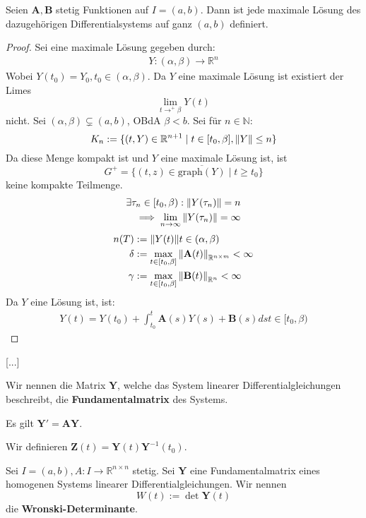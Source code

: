 \documentclass{report}
\newcommand{\tbf}[1]{\textbf{#1}}
\newcommand{\bN}{\mathbb{N}}
\newcommand{\bR}{\mathbb{R}}
\newcommand{\tbA}{\mathbf{A}}
\newcommand{\tbB}{\mathbf{B}}
\newcommand{\tbY}{\mathbf{Y}}
\newcommand{\tbZ}{\mathbf{Z}}
\begin{document}
\begin{theorem}
	Seien $\tbA, \tbB$ stetig Funktionen auf $I = (a,b)$. Dann ist jede maximale Lösung des dazugehörigen Differentialsystems auf ganz $(a,b)$ definiert.
\end{theorem}
\begin{proof}
	Sei eine maximale Lösung gegeben durch:
	\begin{align*}
		Y : (\alpha, \beta) \to \bR^n
	\end{align*}
	Wobei $Y(t_0) = Y_0, t_0 \in (\alpha, \beta)$. Da $Y$ eine maximale Lösung ist existiert der Limes
	\[\lim_{t \to^+ \beta} Y(t)\] 
	nicht. Sei $(\alpha, \beta) \subsetneq (a,b)$, OBdA $\beta < b$. Sei für $n \in \bN$:
	\[K_n := \{(t,Y) \in \bR^{n+1} \mid t \in [t_0, \beta], \norm{Y} \leq n\}\]
	Da diese Menge kompakt ist und $Y$ eine maximale Lösung ist, ist
	\[G^+ = \{(t,z) \in \overline{\text{graph}(Y)} \mid t \geq t_0\}\]
	keine kompakte Teilmenge.
	\begin{align*}
		\exists \tau_n \in [t_0, \beta) : \norm{Y(\tau_n)} = n\\
		\implies \lim_{n \to \infty} \norm{Y(\tau_n)} = \infty
	\end{align*}
	\begin{align*}
		n(T) &:= \norm{Y(t)} t \in (\alpha, \beta)\\
		\delta &:= \max_{t \in [t_0, \beta]} \norm{\tbA(t)}_{\bR^{n \times m}} < \infty\\
		\gamma &:= \max_{t \in [t_0, \beta]} \norm{\tbB(t)}_{\bR^{n}} < \infty\\
	\end{align*}
	Da $Y$ eine Lösung ist, ist:
	\begin{align*}
		Y(t) = Y(t_0) + \int_{t_0}^t \tbA(s)Y(s) + \tbB(s) ds t \in [t_0, \beta)
	\end{align*}
\end{proof}
[...]
\clearpage
\begin{definition}
	Wir nennen die Matrix $\tbY$, welche das System linearer Differentialgleichungen beschreibt, die \textbf{Fundamentalmatrix} des Systems.
\end{definition}
\begin{lemma}
	Es gilt $\tbY' = \tbA \tbY$.
\end{lemma}
\begin{definition}
	Wir definieren $\tbZ(t) = \tbY(t) \tbY^{-1}(t_0)$.
\end{definition}
\begin{definition}
	Sei $I = (a,b), A : I \to \bR^{n \times n}$ stetig. Sei $\tbY$ eine Fundamentalmatrix eines homogenen Systems linearer Differentialgleichungen. Wir nennen
	\[W(t) := \det{\tbY(t)}\]
	die \tbf{Wronski-Determinante}.
\end{definition}
\end{document}
